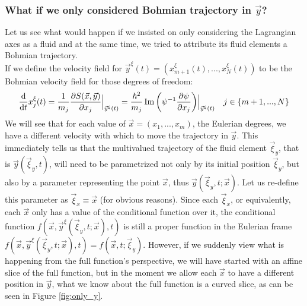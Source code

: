\documentclass[11pt, a4paper]{article} %
\DeclareRobustCommand{\mybox}[2][gray!10]{%
\begin{tcolorbox}[   %
        left=0.2cm,
        right=0.2cm,
        top=0.15cm,
        bottom=0.15cm,
        colback=#1,
        colframe=#1,
        width=\dimexpr\textwidth\relax, 
        enlarge left by=0mm,
        boxsep=5pt,
        arc=0pt,outer arc=0pt,
        ]
        #2
\end{tcolorbox}
}
\begin{document}
\mybox{
\subsubsection*{What if we only considered Bohmian trajectory in $\vec{y}$?}

Let us see what would happen if we insisted on only considering the Lagrangian axes as a fluid and at the same time, we tried to attribute its fluid elements a Bohmian trajectory.\\

If we define the velocity field for $\vec{y}^\xi(t)=(x_{m+1}^\xi(t), ...,x_N^\xi(t))$ to be the Bohmian velocity field for those degrees of freedom:
\begin{equation}
\dv{}{t}x_j^\xi(t)=\frac{1}{m_j}\pdv{S(\vec{x}, \vec{y})}{x_j}\Big\rvert_{\vec{y}^\xi(t)}=\frac{\hbar^2}{m_j}\Im\qty( \psi^{-1} \pdv{\psi}{x_j})\Big\rvert_{\vec{y}^\xi(t)} \quad j\in\{m+1,...,N\}
\end{equation}
We will see that for each value of $\vec{x}=(x_1,...,x_m)$, the Eulerian degrees, we have a different velocity with which to move the trajectory in $\vec{y}$. This immediately tells us that the multivalued trajectory of the fluid element $\vec{\xi}_y$, that is $\vec{y}(\vec{\xi}_y,t)$, will need to be parametrized not only by its initial position $\vec{\xi}_y$, but also by a parameter representing the point $\vec{x}$, thus $\vec{y}(\vec{\xi}_y,t; \vec{x})$. Let us re-define this parameter as $\vec{\xi}_x\equiv \vec{x}$ (for obvious reasons). Since each $\vec{\xi}_x$, or equivalently, each $\vec{x}$  only has a value of the conditional function over it, the conditional function $f(\vec{x},\vec{y}^\xi(\vec{\xi}_y,t; \vec{x}),t)$ is still a proper function in the Eulerian frame $f(\vec{x},\vec{y}^\xi(\vec{\xi}_y,t; \vec{x}),t)=f(\vec{x},t; \vec{\xi}_y)$. However, if we suddenly view what is happening from the full function's perspective, we will have started with an affine slice of the full function, but in the moment we allow each $\vec{x}$ to have a different position in $\vec{y}$, what we know about the full function is a curved slice, as can be seen in Figure \ref{fig:only_y}.

}
\end{document}
